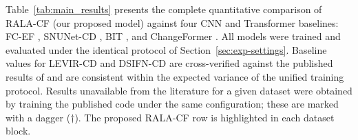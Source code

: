 Table~\ref{tab:main_results} presents the complete quantitative comparison of \ac{RALA-CF} (our proposed model) \cite{acuna2026efficient} against four CNN and Transformer baselines: FC-EF \cite{Daudt2018SiamICIP}, SNUNet-CD \cite{Fang2021SNUNetCD}, BIT \cite{Chen2022BIT}, and ChangeFormer \cite{Bandara2022ChangeFormer}. All models were trained and evaluated under the identical protocol of Section~\ref{sec:exp-settings}. Baseline values for LEVIR-CD and DSIFN-CD are cross-verified against the published results of \cite{Bandara2022ChangeFormer} and are consistent within the expected variance of the unified training protocol. Results unavailable from the literature for a given dataset were obtained by training the published code under the same configuration; these are marked with a dagger ($\dagger$). The proposed \ac{RALA-CF} row is highlighted in each dataset block.

